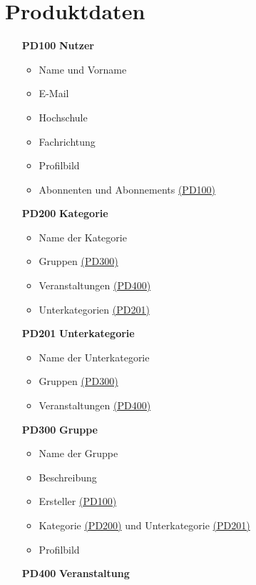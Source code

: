 \documentclass[parskip=full]{scrartcl}
\begin{document}
	\section{Produktdaten}
	\begin{itemize}
		\item[\textbf{PD100}] \textbf{Nutzer} \label{sec:PD100}
			\begin{itemize}[nosep]
				\item Name und Vorname
				\item E-Mail
				\item Hochschule
				\item Fachrichtung
				\item Profilbild
				\item Abonnenten und Abonnements \hyperref[sec:PD100]{(PD100)}
			\end{itemize}
		\item[\textbf{PD200}] \textbf{Kategorie} \label{sec:PD200}
			\begin{itemize}[nosep]
				\item Name der Kategorie
				\item Gruppen \hyperref[sec:PD300]{(PD300)}
				\item Veranstaltungen \hyperref[sec:PD400]{(PD400)}
				\item Unterkategorien \hyperref[sec:PD201]{(PD201)}
			\end{itemize}
		\item[\textbf{PD201}] \textbf{Unterkategorie} \label{sec:PD201}
			\begin{itemize}[nosep]
				\item Name der Unterkategorie
				\item Gruppen \hyperref[sec:PD300]{(PD300)}
				\item Veranstaltungen \hyperref[sec:PD400]{(PD400)}
			\end{itemize}
		\item[\textbf{PD300}] \textbf{Gruppe} \label{sec:PD300}
			\begin{itemize}
				\item Name der Gruppe
				\item Beschreibung
				\item Ersteller \hyperref[sec:PD100]{(PD100)}
				\item Kategorie \hyperref[sec:P200]{(PD200)} und Unterkategorie \hyperref[sec:PD201]{(PD201)}
				\item Profilbild
			\end{itemize}
		\item[\textbf{PD400}] \textbf{Veranstaltung} \label{sec:PD400}

\end{itemize}
\end{document}
